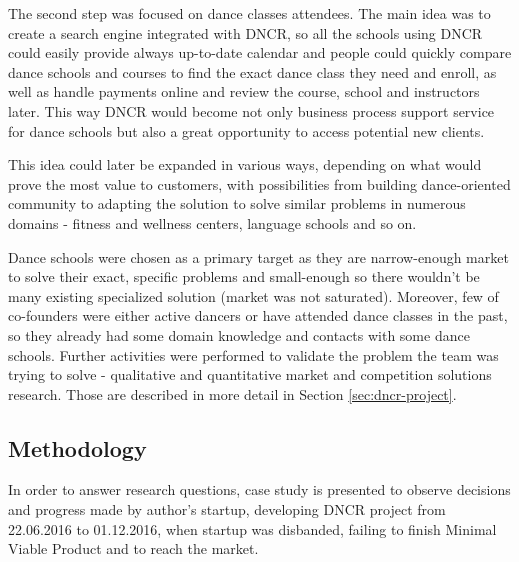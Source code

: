 \documentclass{article}
\begin{document}
The second step was focused on dance classes attendees. The main idea was to create a search engine integrated with DNCR, so all the schools using DNCR could easily provide always up-to-date calendar and people could quickly compare dance schools and courses to find the exact dance class they need and enroll, as well as handle payments online and review the course, school and instructors later. This way DNCR would become not only business process support service for dance schools but also a great opportunity to access potential new clients.

This idea could later be expanded in various ways, depending on what would prove the most value to customers, with possibilities from building dance-oriented community to adapting the solution to solve similar problems in numerous domains - fitness and wellness centers, language schools and so on.

Dance schools were chosen as a primary target as they are narrow-enough market to solve their exact, specific problems and small-enough so there wouldn't be many existing specialized solution (market was not saturated). Moreover, few of co-founders were either active dancers or have attended dance classes in the past, so they already had some domain knowledge and contacts with some dance schools. Further activities were performed to validate the problem the team was trying to solve - qualitative and quantitative market and competition solutions research. Those are described in more detail in Section \ref{sec:dncr-project}.

\subsection{Methodology}
In order to answer research questions, case study is presented to observe decisions and progress made by author's startup, developing DNCR project from 22.06.2016 to 01.12.2016, when startup was disbanded, failing to finish Minimal Viable Product and to reach the market.
\end{document}
